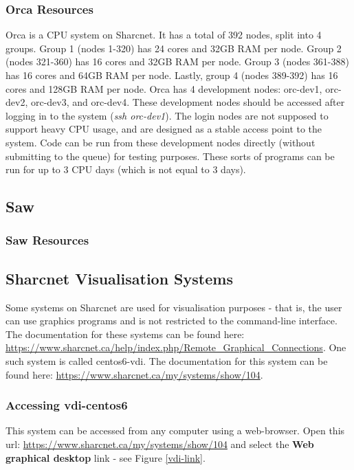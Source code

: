 \documentclass[12pt]{article}
\begin{document}
\subsubsection{Orca Resources}

\quad Orca is a CPU system on Sharcnet. It has a total of 392 nodes, split into 4 groups. Group 1 (nodes 1-320) has 24 cores and 32GB RAM per node. Group 2 (nodes 321-360) has 16 cores and 32GB RAM per node. Group 3 (nodes 361-388) has 16 cores and 64GB RAM per node. Lastly, group 4 (nodes 389-392) has 16 cores and 128GB RAM per node. Orca has 4 development nodes: orc-dev1, orc-dev2, orc-dev3, and orc-dev4. These development nodes should be accessed after logging in to the system (\textit{ssh orc-dev1}). The login nodes are not supposed to support heavy CPU usage, and are designed as a stable access point to the system. Code can be run from these development nodes directly (without submitting to the queue) for testing purposes. These sorts of programs can be run for up to 3 CPU days (which is not equal to 3 days). 

\subsection{Saw}

\subsubsection{Saw Resources}

\subsection{Sharcnet Visualisation Systems}\label{visual}

\quad Some systems on Sharcnet are used for visualisation purposes - that is, the user can use graphics programs and is not restricted to the command-line interface. The documentation for these systems can be found here: \url{https://www.sharcnet.ca/help/index.php/Remote_Graphical_Connections}. One such system is called centos6-vdi. The documentation for this system can be found here: \url{https://www.sharcnet.ca/my/systems/show/104}. 

\subsubsection{Accessing vdi-centos6}

\quad This system can be accessed from any computer using a web-browser. Open this url: \url{https://www.sharcnet.ca/my/systems/show/104} and select the \textbf{Web graphical desktop} link - see Figure \ref{vdi-link}.
\end{document}
